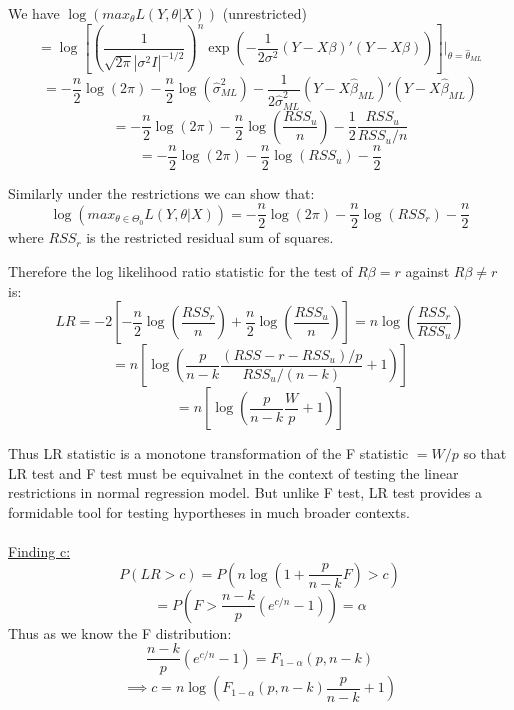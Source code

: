\documentclass[DIV=14,titlepage=false]{scrreprt}
\begin{document}
We have \(\log(max_{\theta} L(Y,\theta|X))\) (unrestricted)
\[=\log\left[\left(\frac{1}{\sqrt{2\pi}|\sigma^2I|^{-1/2}}\right)^n\exp(-\frac{1}{2\sigma^2}(Y-X\beta)'(Y-X\beta))\right]\bigg|_{\theta=\hat{\theta}_{ML}}\]
\[=-\frac{n}{2}\log(2\pi)-\frac{n}{2}\log(\hat{\sigma}^2_{ML})-\frac{1}{2\hat{\sigma}^2_{ML}}(Y-X\hat{\beta}_{ML})'(Y-X\hat{\beta}_{ML})\]
\[=-\frac{n}{2}\log(2\pi)-\frac{n}{2}\log(\frac{RSS_u}{n})-\frac{1}{2}\frac{RSS_u}{RSS_u/n}\]
\[=-\frac{n}{2}\log(2\pi)-\frac{n}{2}\log(RSS_u)-\frac{n}{2}\]

Similarly under the restrictions we can show that:
\[\log(max_{\theta \in \Theta_0} L(Y,\theta|X))=-\frac{n}{2}\log(2\pi)-\frac{n}{2}\log(RSS_r)-\frac{n}{2}\]
where \(RSS_r\) is the restricted residual sum of squares.

Therefore the log likelihood ratio statistic for the test of \(R\beta=r\) against \(R\beta\neq r\) is:
\[LR=-2\left[-\frac{n}{2}\log(\frac{RSS_r}{n})+\frac{n}{2}\log(\frac{RSS_u}{n})\right]=n\log(\frac{RSS_r}{RSS_u})\]
\[=n\left[\log\left(\frac{p}{n-k}\frac{(RSS-r-RSS_u)/p}{RSS_u/(n-k)}+1\right)\right]\]
\[=n\left[\log\left(\frac{p}{n-k}\frac{W}{p}+1\right)\right]\]

Thus LR statistic is a monotone transformation of the F statistic \(=W/p\) so that LR test and F test must be equivalnet in the context of testing the linear restrictions in normal regression model. But unlike F test, LR test provides a formidable tool for testing hyportheses in much broader contexts.
\\ \\
\underline{Finding c:}
\[P(LR>c)=P(n\log(1+\frac{p}{n-k}F)>c)\]
\[=P(F>\frac{n-k}{p}(e^{c/n}-1))=\alpha\]
Thus as we know the F distribution:
\[\frac{n-k}{p}(e^{c/n}-1)=F_{1-\alpha}(p,n-k)\]
\[\implies c=n \log(F_{1-\alpha}(p,n-k)\frac{p}{n-k}+1)\]
\end{document}
